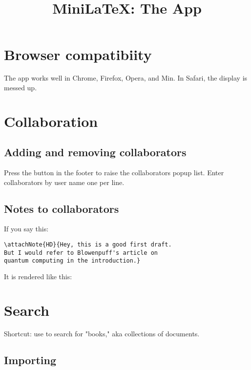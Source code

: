 \title{MiniLaTeX: The App}

\maketitle

\tableofcontents


\section{Browser compatibiity}

The app works well in Chrome, Firefox, Opera, and Min.   In Safari, the display is messed up.



\section{Collaboration}

\subsection{Adding and removing collaborators}

Press the  button in the footer to raise the collaborators popup list.  Enter collaborators by user name one per line.


\subsection{Notes to collaborators}

If you say this:

\begin{verbatim}
\attachNote{HD}{Hey, this is a good first draft.  
But I would refer to Blowenpuff's article on 
quantum computing in the introduction.}
\end{verbatim}

It is rendered like this:


\section{Search}

Shortcut: use  to search for "books," aka collections of documents.


\subsection{Importing}

